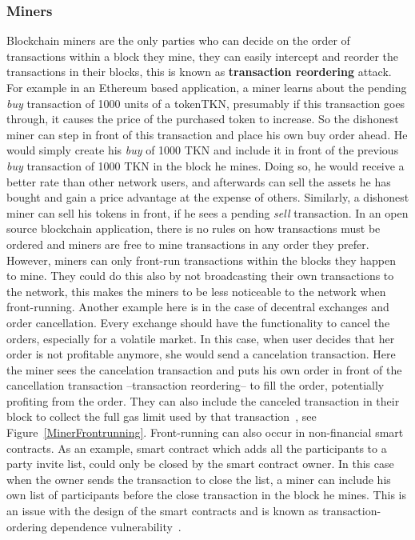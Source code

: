 \subsubsection{Miners} \label{minersfrontrunning}
Blockchain miners are the only parties who can decide on the order of transactions within a block they mine, they can easily intercept and reorder the transactions in their blocks, this is known as \textbf{transaction reordering} attack.  For example in an Ethereum based application, a miner learns about the pending \textit{buy} transaction of 1000 units of a token\ie TKN, presumably if this transaction goes through, it causes the price of the purchased token to increase. So the dishonest miner can step in front of this transaction and place his own buy order ahead. He would simply create his \textit{buy} of 1000 TKN and include it in front of the previous \textit{buy} transaction of 1000 TKN in the block he mines. Doing so, he would receive a better rate than other network users, and afterwards can sell the assets he has bought and gain a price advantage at the expense of others. Similarly, a dishonest miner can sell his tokens in front, if he sees a pending \textit{sell} transaction. In an open source blockchain application, there is no rules on how transactions must be ordered and miners are free to mine transactions in any order they prefer. However, miners can only front-run transactions within the blocks they happen to mine. They could do this also by not broadcasting their own transactions to the network, this makes the miners to be less noticeable to the network when front-running.
Another example here is in the case of decentral exchanges and order cancellation. Every exchange should have the functionality to cancel the orders, especially for a volatile market. In this case, when user decides that her order is not profitable anymore, she would send a cancelation transaction. Here the miner sees the cancelation transaction and puts his own order in front of the cancellation transaction --transaction reordering-- to fill the order, potentially profiting from the order. They can also include the canceled transaction in their block to collect the full gas limit used by that transaction~\cite{CostofDecentralization:online}, see Figure~\ref{MinerFrontrunning}. Front-running can also occur in non-financial smart contracts. As an example, smart contract which adds all the participants to a party invite list, could only be closed by the smart contract owner. In this case when the owner sends the transaction to close the list, a miner can include his own list of participants before the close transaction in the block he mines. This is an issue with the design of the smart contracts and is known as transaction-ordering dependence vulnerability~\cite{luu2016making}. 


